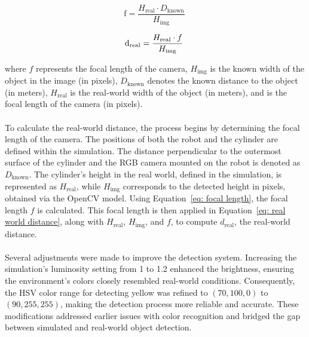 \begin{equation}
\text{f} = \frac{H_{\text{real}}\cdot D_{\text{known}}}{H_{\text{img}}}\
\label{eq: focal length}
\end{equation}

\begin{equation}
\text d_{\text{real}} = \frac{H_{\text{real}}\cdot f}{H_{\text{img}}}\
\label{eq: real world distance}
\end{equation}

where \(f\) represents the focal length of the camera, \(H_{\text{img}}\) is the known width of the object in the image (in pixels), \(D_{\text{known}}\) denotes the known distance to the object (in meters), \(H_{\text{real}}\) is the real-world width of the object (in meters), and {} is the focal length of the camera (in pixels).

\paragraph*{}
To calculate the real-world distance, the process begins by determining the focal length of the camera. The positions of both the robot and the cylinder are defined within the simulation. The distance perpendicular to the outermost surface of the cylinder and the RGB camera mounted on the robot is denoted as \(D_{\text{known}}\). The cylinder's height in the real world, defined in the simulation, is represented as \(H_{\text{real}}\), while \(H_{\text{img}}\) corresponds to the detected height in pixels, obtained via the OpenCV model. Using Equation~\ref{eq: focal length}, the focal length \(f\) is calculated. This focal length is then applied in Equation~\ref{eq: real world distance}, along with \(H_{\text{real}}\), \(H_{\text{img}}\), and \(f\), to compute \(d_{\text{real}}\), the real-world distance.


\paragraph*{}
Several adjustments were made to improve the detection system. Increasing the simulation's luminosity setting from 1 to 1.2 enhanced the brightness, ensuring the environment's colors closely resembled real-world conditions. Consequently, the HSV color range for detecting yellow was refined to \((70, 100, 0)\) to \((90, 255, 255)\), making the detection process more reliable and accurate. These modifications addressed earlier issues with color recognition and bridged the gap between simulated and real-world object detection.


